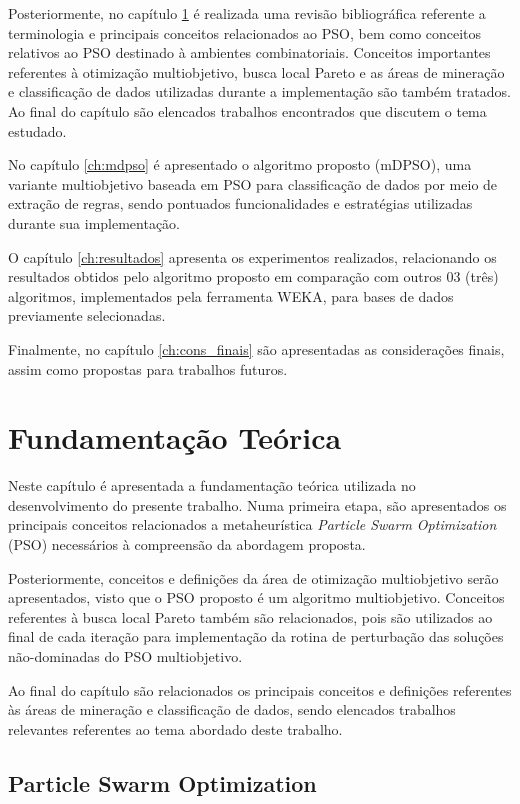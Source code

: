 \documentclass[
	12pt,				%
	openany,			%
	oneside,	
	a4paper,			%
	brazil,				%
	]{unimontes-ppgmsc-abntex2}
\begin{document}
Posteriormente, no capítulo \ref{ch:ref_teorico} é realizada uma revisão bibliográfica referente a terminologia e principais conceitos relacionados ao PSO, bem como conceitos relativos ao PSO destinado à ambientes combinatoriais. Conceitos importantes referentes à otimização multiobjetivo, busca local Pareto e as áreas de mineração e classificação de dados utilizadas durante a implementação são também tratados. Ao final do capítulo são elencados trabalhos encontrados que discutem o tema estudado.

No capítulo \ref{ch:mdpso} é apresentado o algoritmo proposto (mDPSO), uma variante multiobjetivo baseada em PSO para classificação de dados por meio de extração de regras, sendo pontuados funcionalidades e estratégias utilizadas durante sua implementação.

O capítulo \ref{ch:resultados} apresenta os experimentos realizados, relacionando os resultados obtidos pelo algoritmo proposto em comparação com outros 03 (três) algoritmos, implementados pela ferramenta WEKA, para bases de dados previamente selecionadas.

Finalmente, no capítulo \ref{ch:cons_finais} são apresentadas as considerações finais, assim como propostas para trabalhos futuros.


\chapter{Fundamentação Teórica}
\label{ch:ref_teorico}

Neste capítulo é apresentada a fundamentação teórica utilizada no desenvolvimento do presente trabalho. Numa primeira etapa, são apresentados os principais conceitos relacionados a metaheurística {\em Particle Swarm Optimization} (PSO) necessários à compreensão da abordagem proposta. 

Posteriormente, conceitos e definições da área de otimização multiobjetivo serão apresentados, visto que o PSO proposto é um algoritmo multiobjetivo. Conceitos referentes à busca local Pareto também são relacionados, pois são utilizados ao final de cada iteração para implementação da rotina de perturbação das soluções não-dominadas do PSO multiobjetivo. 

Ao final do capítulo são relacionados os principais conceitos e definições referentes às áreas de mineração e classificação de dados, sendo elencados trabalhos relevantes referentes ao tema abordado deste trabalho.


\section{Particle Swarm Optimization}
\label{ch:pso}
\end{document}
